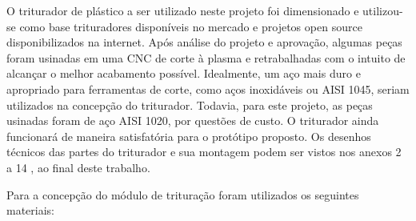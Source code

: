 O triturador de plástico a ser utilizado neste projeto foi dimensionado e utilizou-se como base trituradores disponíveis no mercado e projetos open source disponibilizados na internet. Após análise do projeto e aprovação, algumas peças foram usinadas em uma CNC de corte à plasma e retrabalhadas com o intuito de alcançar o melhor acabamento possível. Idealmente, um aço mais duro e apropriado para ferramentas de corte, como aços inoxidáveis ou AISI 1045, seriam utilizados na concepção do triturador. Todavia, para este projeto, as peças usinadas foram de aço AISI 1020, por questões de custo.  O triturador ainda funcionará de maneira satisfatória para o protótipo proposto. Os desenhos técnicos das partes do triturador e sua montagem podem ser vistos nos anexos 2 a 14 , ao final deste trabalho.

Para a concepção do módulo de trituração foram utilizados os seguintes materiais:

\newpage

